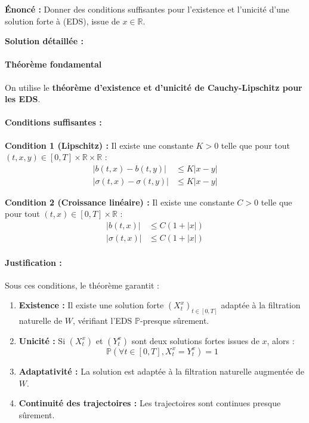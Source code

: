 \documentclass[12pt,a4paper]{article}
\theoremstyle{definition}
\theoremstyle{remark}
\newcommand{\R}{\mathbb{R}}
\newcommand{\Prob}{\mathbb{P}}
\begin{document}
\textbf{Énoncé :} Donner des conditions suffisantes pour l'existence et l'unicité d'une solution forte à (EDS), issue de $x \in \R$.

\textbf{Solution détaillée :}

\paragraph{Théorème fondamental}
On utilise le \textbf{théorème d'existence et d'unicité de Cauchy-Lipschitz pour les EDS}.

\paragraph{Conditions suffisantes :}

\textbf{Condition 1 (Lipschitz) :} Il existe une constante $K > 0$ telle que pour tout $(t,x,y) \in [0,T] \times \R \times \R$ :
\begin{align}
|b(t,x) - b(t,y)| &\leq K|x-y| \\
|\sigma(t,x) - \sigma(t,y)| &\leq K|x-y|
\end{align}

\textbf{Condition 2 (Croissance linéaire) :} Il existe une constante $C > 0$ telle que pour tout $(t,x) \in [0,T] \times \R$ :
\begin{align}
|b(t,x)| &\leq C(1 + |x|) \\
|\sigma(t,x)| &\leq C(1 + |x|)
\end{align}

\paragraph{Justification :}
Sous ces conditions, le théorème garantit :
\begin{enumerate}[label=(\alph*)]
\item \textbf{Existence :} Il existe une solution forte $(X_t^x)_{t \in [0,T]}$ adaptée à la filtration naturelle de $W$, vérifiant l'EDS $\Prob$-presque sûrement.

\item \textbf{Unicité :} Si $(X_t^x)$ et $(Y_t^x)$ sont deux solutions fortes issues de $x$, alors :
\[
\Prob\left(\forall t \in [0,T], X_t^x = Y_t^x\right) = 1
\]

\item \textbf{Adaptativité :} La solution est adaptée à la filtration naturelle augmentée de $W$.

\item \textbf{Continuité des trajectoires :} Les trajectoires sont continues presque sûrement.
\end{enumerate}
\end{document}
